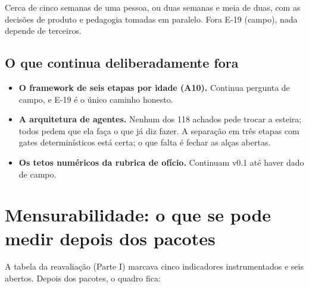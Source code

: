 \documentclass[11pt,a4paper]{article}
\begin{document}
Cerca de cinco semanas de uma pessoa, ou duas semanas e meia de duas, com as decisões de produto e
pedagogia tomadas em paralelo. Fora E-19 (campo), nada depende de terceiros.

\subsection{O que continua deliberadamente fora}

\begin{itemize}
  \item \textbf{O framework de seis etapas por idade (A10).} Continua pergunta de campo, e E-19 é o
        único caminho honesto.
  \item \textbf{A arquitetura de agentes.} Nenhum dos 118 achados pede trocar a esteira; todos pedem
        que ela faça o que já diz fazer. A separação em três etapas com gates determinísticos está
        certa; o que falta é fechar as alças abertas.
  \item \textbf{Os tetos numéricos da rubrica de ofício.} Continuam v0.1 até haver dado de campo.
\end{itemize}

\section{Mensurabilidade: o que se pode medir depois dos pacotes}

A tabela da reavaliação (Parte I) marcava cinco indicadores instrumentados e seis abertos. Depois
dos pacotes, o quadro fica:
\end{document}
